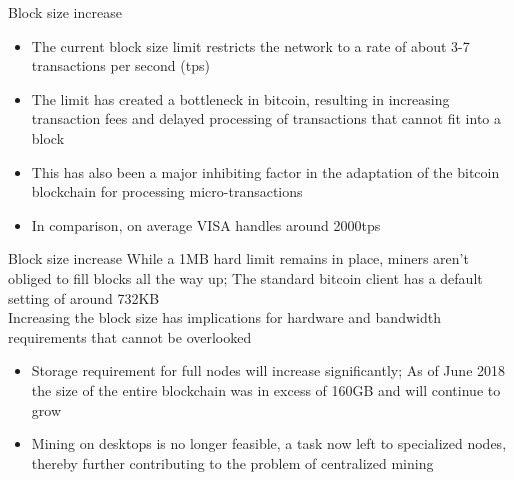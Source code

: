 \documentclass[10pt]{beamer}
\begin{document}

\begin{frame}{Block size increase}
	\begin{itemize}
		\item The current block size limit restricts the network to a rate of about 3-7 transactions per second (tps)
		\item The limit has created a bottleneck in bitcoin, resulting in increasing transaction fees and delayed processing of transactions that cannot fit into a block
		\item This has also been a major inhibiting factor in the adaptation of the bitcoin blockchain for processing micro-transactions
		\item In comparison, on average VISA handles around 2000tps
	\end{itemize}
\end{frame}



\begin{frame}{Block size increase}
	While a 1MB hard limit remains in place, miners aren't obliged to fill blocks all the way up; The standard bitcoin client has a default setting of around 732KB \\\vspace{3mm}
	Increasing the block size has implications for hardware and bandwidth requirements that cannot be overlooked
	\begin{itemize}
		\item Storage requirement for full nodes will increase significantly; As of June 2018 the size of the entire blockchain was in excess of 160GB and will continue to grow
		\item Mining on desktops is no longer feasible, a task now left to specialized nodes, thereby further contributing to the problem of centralized mining
	\end{itemize}
\end{frame}

\end{document}

